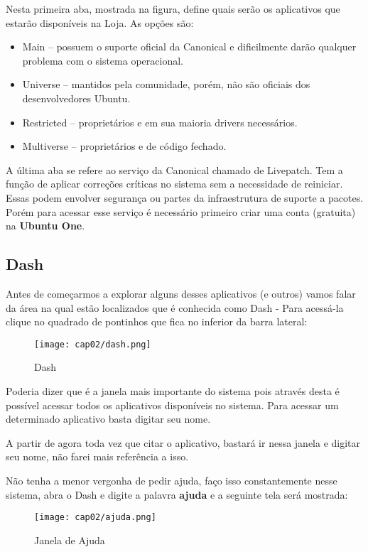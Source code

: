 Nesta primeira aba, mostrada na figura, define quais serão os aplicativos que estarão disponíveis na Loja. As opções são: \vspace{-1em}
\begin{itemize}[noitemsep]
 \item Main – possuem o suporte oficial da Canonical e dificilmente darão qualquer problema com o sistema operacional.
 \item Universe – mantidos pela comunidade, porém, não são oficiais dos desenvolvedores Ubuntu. 
 \item Restricted – proprietários e em sua maioria drivers necessários. 
 \item Multiverse – proprietários e de código fechado. 
\end{itemize}

A última aba se refere ao serviço da Canonical chamado de Livepatch. Tem a função de aplicar correções críticas no sistema sem a necessidade de reiniciar. Essas podem envolver segurança ou partes da infraestrutura de suporte a pacotes. Porém para acessar esse serviço é necessário primeiro criar uma conta (gratuita) na \textbf{Ubuntu One}.

\subsection{Dash}
Antes de começarmos a explorar alguns desses aplicativos (e outros) vamos falar da área na qual estão localizados que é conhecida como Dash - Para acessá-la clique no quadrado de pontinhos que fica no inferior da barra lateral:
\begin{figure}[H]
 \centering\texttt{[image: cap02/dash.png]}
 \caption{Dash}
\end{figure}

Poderia dizer que é a janela mais importante do sistema pois através desta é possível acessar todos os aplicativos disponíveis no sistema. Para acessar um determinado aplicativo basta digitar seu nome.
\\[3mm]
\begin{dica} A partir de agora toda vez que citar o aplicativo, bastará ir nessa janela e digitar seu nome, não farei mais referência a isso.
\end{dica}

Não tenha a menor vergonha de pedir ajuda, faço isso constantemente nesse sistema, abra o Dash e digite a palavra \textbf{ajuda} e a seguinte tela será mostrada:
\begin{figure}[H]
 \centering\texttt{[image: cap02/ajuda.png]}
 \caption{Janela de Ajuda}
\end{figure}

